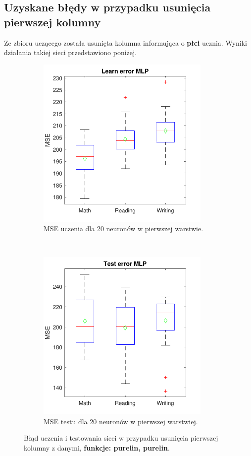 \documentclass[12pt]{article}
\begin{document}
\subsection{Uzyskane błędy w przypadku usunięcia pierwszej kolumny}
Ze zbioru uczącego została usunięta kolumna informująca o \textbf{płci} ucznia. Wyniki działania takiej sieci przedstawiono poniżej.

\begin{figure}[H]
\centering
\begin{subfigure}[t]{0.48\textwidth} 
\centering
\includegraphics[height=3.3in]{purelin_purelin_20_without_1_learnBoxplot.pdf}
\caption{MSE uczenia dla  20 neuronów w pierwszej warstwie.}
\end{subfigure}
~~
\begin{subfigure}[t]{0.48\textwidth} 
\centering
\includegraphics[height=3.3in]{purelin_purelin_20_without_1_testBoxplot.pdf}
\caption{MSE testu dla  20  neuronów w pierwszej warstwiej.}
\end{subfigure}

\caption{Błąd uczenia i testowania sieci w przypadku usunięcia pierwszej kolumny z danymi, \textbf{funkcje: purelin, purelin}.}
\end{figure}
\end{document}
